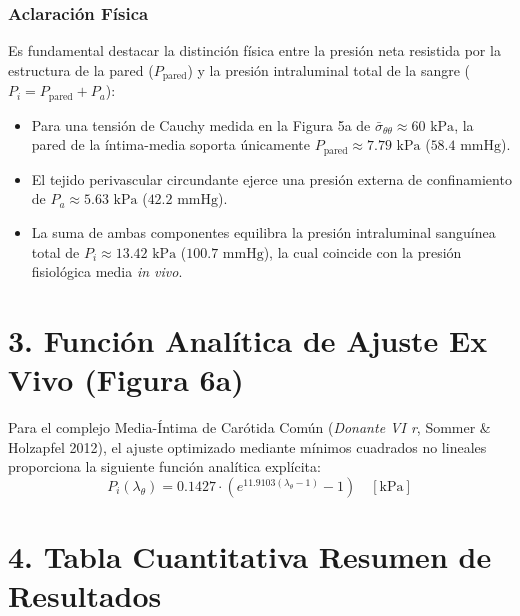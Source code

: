 \documentclass[10pt,a4paper]{article}
\begin{document}
\subsubsection*{Aclaración Física}
\noindent Es fundamental destacar la distinción física entre la presión neta resistida por la estructura de la pared ($P_{\text{pared}}$) y la presión intraluminal total de la sangre ($P_i = P_{\text{pared}} + P_a$):
\begin{itemize}
\item Para una tensión de Cauchy medida en la Figura 5a de $\bar{\sigma}_{\theta\theta} \approx 60\text{ kPa}$, la pared de la íntima-media soporta únicamente $P_{\text{pared}} \approx 7.79\text{ kPa}$ ($58.4\text{ mmHg}$).
\item El tejido perivascular circundante ejerce una presión externa de confinamiento de $P_a \approx 5.63\text{ kPa}$ ($42.2\text{ mmHg}$).
\item La suma de ambas componentes equilibra la presión intraluminal sanguínea total de $P_i \approx 13.42\text{ kPa}$ ($100.7\text{ mmHg}$), la cual coincide con la presión fisiológica media \textit{in vivo}.
\end{itemize}

\section{3. Función Analítica de Ajuste Ex Vivo (Figura 6a)}
Para el complejo Media-Íntima de Carótida Común (\textit{Donante VI r}, Sommer \& Holzapfel 2012), el ajuste optimizado mediante mínimos cuadrados no lineales proporciona la siguiente función analítica explícita:
\begin{equation}
P_i(\lambda_\theta) = 0.1427 \cdot \left( e^{11.9103(\lambda_\theta - 1)} - 1 \right) \quad [\text{kPa}]
\end{equation}

\section{4. Tabla Cuantitativa Resumen de Resultados}
\end{document}
